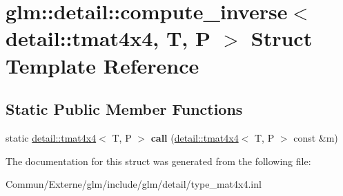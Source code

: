 \hypertarget{structglm_1_1detail_1_1compute__inverse_3_01detail_1_1tmat4x4_00_01_t_00_01_p_01_4}{}\section{glm\+:\+:detail\+:\+:compute\+\_\+inverse$<$ detail\+:\+:tmat4x4, T, P $>$ Struct Template Reference}
\label{structglm_1_1detail_1_1compute__inverse_3_01detail_1_1tmat4x4_00_01_t_00_01_p_01_4}
\subsection*{Static Public Member Functions}
\begin{DoxyCompactItemize}
\item 
static \hyperlink{structglm_1_1detail_1_1tmat4x4}{detail\+::tmat4x4}$<$ T, P $>$ {\bfseries call} (\hyperlink{structglm_1_1detail_1_1tmat4x4}{detail\+::tmat4x4}$<$ T, P $>$ const \&m)\hypertarget{structglm_1_1detail_1_1compute__inverse_3_01detail_1_1tmat4x4_00_01_t_00_01_p_01_4_a8fd080ed01ae197f2274742a8f1417f3}{}\label{structglm_1_1detail_1_1compute__inverse_3_01detail_1_1tmat4x4_00_01_t_00_01_p_01_4_a8fd080ed01ae197f2274742a8f1417f3}

\end{DoxyCompactItemize}


The documentation for this struct was generated from the following file\+:\begin{DoxyCompactItemize}
\item 
Commun/\+Externe/glm/include/glm/detail/type\+\_\+mat4x4.\+inl\end{DoxyCompactItemize}
